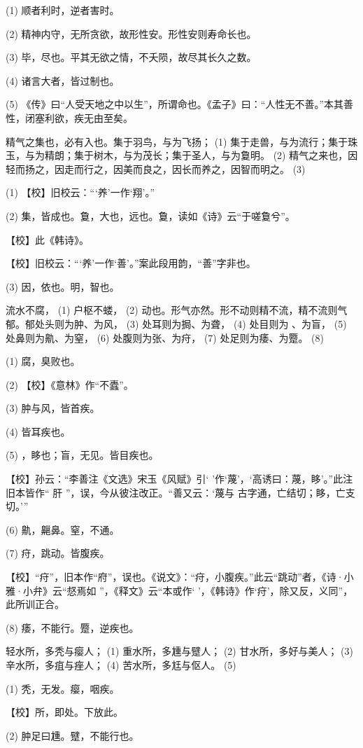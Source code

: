\documentclass[12pt,UTF8]{ctexbook}
\begin{document}
(1) 顺者利时，逆者害时。

(2) 精神内守，无所贪欲，故形性安。形性安则寿命长也。

(3) 毕，尽也。平其无欲之情，不夭陨，故尽其长久之数。

(4) 诸言大者，皆过制也。

(5) 《传》曰“人受天地之中以生”，所谓命也。《孟子》曰：“人性无不善。”本其善性，闭塞利欲，疾无由至矣。

精气之集也，必有入也。集于羽鸟，与为飞扬； (1) 集于走兽，与为流行；集于珠玉，与为精朗；集于树木，与为茂长；集于圣人，与为敻明。 (2) 精气之来也，因轻而扬之，因走而行之，因美而良之，因长而养之，因智而明之。 (3)

(1) 【校】旧校云：“‘养’一作‘翔’。”

(2) 集，皆成也。敻，大也，远也。敻，读如《诗》云“于嗟敻兮”。

【校】此《韩诗》。

【校】旧校云：“‘养’一作‘善’。”案此段用韵，“善”字非也。

(3) 因，依也。明，智也。

流水不腐， (1) 户枢不蝼， (2) 动也。形气亦然。形不动则精不流，精不流则气郁。郁处头则为肿、为风， (3) 处耳则为挶、为聋， (4) 处目则为 、为盲， (5) 处鼻则为鼽、为窒， (6) 处腹则为张、为疛， (7) 处足则为痿、为蹷。 (8)

(1) 腐，臭败也。

(2) 【校】《意林》作“不蠹”。

(3) 肿与风，皆首疾。

(4) 皆耳疾也。

(5) ，眵也；盲，无见。皆目疾也。

【校】孙云：“李善注《文选》宋玉《风赋》引‘ ’作‘蔑’，‘高诱曰：蔑，眵’。”此注旧本皆作“ 肝 ”，误，今从彼注改正。“善又云：‘蔑与 古字通，亡结切；眵，亡支切。’”

(6) 鼽，齆鼻。窒，不通。

(7) 疛，跳动。皆腹疾。

【校】“疛”，旧本作“府”，误也。《说文》：“疛，小腹疾。”此云“跳动”者，《诗·小雅·小弁》云“惄焉如 ”，《释文》云“本或作‘ ’，《韩诗》作‘疛’，除又反，义同”，此所训正合。

(8) 痿，不能行。蹷，逆疾也。

轻水所，多秃与瘿人； (1) 重水所，多尰与躄人； (2) 甘水所，多好与美人； (3) 辛水所，多疽与痤人； (4) 苦水所，多尪与伛人。 (5)

(1) 秃，无发。瘿，咽疾。

【校】所，即处。下放此。

(2) 肿足曰尰。躄，不能行也。
\end{document}
